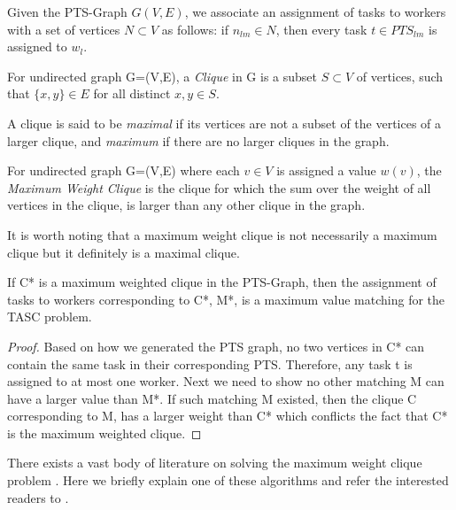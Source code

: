 Given the PTS-Graph $G(V, E)$, we associate an assignment of tasks to workers with a set of vertices $N \subset V$ as follows: if $n_{lm} \in N$, then every task $t \in PTS_{lm}$ is assigned to $w_l$.

\begin{definition} [Clique]
\label{def:clique}
For undirected graph G=(V,E), a \emph{Clique} in G is a subset $S \subset V$ of vertices, such that $\{x,y\} \in E$ for all distinct $x,y \in S$.
\end{definition}

A clique is said to be \emph{maximal} if its vertices are not a subset of the vertices of a larger clique, and \emph{maximum} if there are no larger cliques in the graph.

\begin{definition} 
\label{def:maxClique}
For undirected graph G=(V,E) where each $v \in V$ is assigned a value $w(v)$, the \emph{Maximum Weight Clique} is the clique for which the sum over the weight of all vertices in the clique, is larger than any other clique in the graph.
\end{definition}

It is worth noting that a maximum weight clique is not necessarily a maximum clique but it definitely is a maximal clique.

\begin{theorem}
\label{th:maxClique}
If C* is a maximum weighted clique in the PTS-Graph, then the assignment of tasks to workers corresponding to C*, M*, is a maximum value matching for the TASC problem.
\end{theorem}

\begin{proof}
Based on how we generated the PTS graph, no two vertices in C* can contain the same task in their corresponding PTS. Therefore, any task t is assigned to at most one worker. Next we need to show no other matching M can have a larger value than M*. If such matching M existed, then the clique C corresponding to M, has a larger weight than C* which conflicts the fact that C* is the maximum weighted clique.
\end{proof}

There exists a vast body of literature on solving the maximum weight clique problem \cite{Kovalyov07}. Here we briefly explain one of these algorithms and refer the interested readers to \cite{Ostergard01}.

